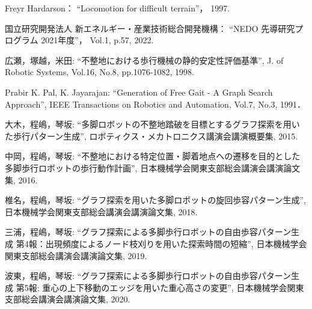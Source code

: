 ﻿\begin{thebibliography}{99}

    Freyr Hardarson：
    ``Locomotion for difficult terrain''，
    1997.

    国立研究開発法人 新エネルギー・産業技術総合開発機構：
    ``NEDO 先導研究プログラム 2021年度''，
    Vol.1,
    p.57, 
    2022. 

    広瀬，塚越，米田: 
    ``不整地における歩行機械の静的安定性評価基準'', 
    J. of Robotic Systems,
    Vol.16, No.8, 
    pp.1076-1082, 
    1998.

    Prabir K. Pal, K. Jayarajan: 
    ``Generation of Free Gait - A Graph Search Approach'',
    IEEE Transactions on Robotics and Automation,
    Vol.7, No.3,
    1991．

    大木，程嶋，琴坂: 
    ``多脚ロボットの不整地踏破を目標とするグラフ探索を用いた歩行パターン生成'', 
    ロボティクス・メカトロニクス講演会講演概要集,
    2015.   

    中岡，程嶋，琴坂: 
    ``不整地における特定位置・脚着地点への遷移を目的とした多脚歩行ロボットの歩行動作計画'',
    日本機械学会関東支部総会講演会講演論文集,
    2016.

    椎名，程嶋，琴坂: 
    ``グラフ探索を用いた多脚ロボットの旋回歩容パターン生成'',
    日本機械学会関東支部総会講演会講演論文集,
    2018.

    三浦，程嶋，琴坂: 
    ``グラフ探索による多脚歩行ロボットの自由歩容パターン生成 第4報：出現頻度によるノード枝刈りを用いた探索時間の短縮'',
    日本機械学会関東支部総会講演会講演論文集,
    2019.

    波東，程嶋，琴坂: 
    ``グラフ探索による多脚歩行ロボットの自由歩容パターン生成 第5報: 重心の上下移動のエッジを用いた重心高さの変更'',
    日本機械学会関東支部総会講演会講演論文集,
    2020.


\end{thebibliography}
\endinput